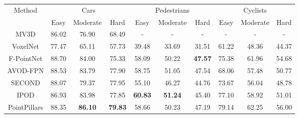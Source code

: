 \documentclass[letterpaper, 10 pt, conference]{ieeeconf}
\begin{document}
\begin{table*}[h]
	\begin{center}
		\begin{tabular}{c|ccc|ccc|ccc}
			\hline
			\multirow{2}{*}{Method}         & \multicolumn{3}{c|}{Cars} & \multicolumn{3}{c|}{Pedestrians} & \multicolumn{3}{c}{Cyclists}                                                                                                       \\ \cline{2-10}
			                                & Easy                      & Moderate                         & Hard                         & Easy           & Moderate       & Hard           & Easy           & Moderate       & Hard           \\ \hline
			MV3D\cite{chen2017multi}        & 86.02                     & 76.90                            & 68.49                        & -              & -              & -              & -              & -              & -              \\
			VoxelNet\cite{zhou2018voxelnet} & 77.47                     & 65.11                            & 57.73                        & 39.48          & 33.69          & 31.51          & 61.22          & 48.36          & 44.37          \\
			F-PointNet\cite{qi2018frustum}  & 88.70                     & 84.00                            & 75.33                        & 58.09          & 50.22          & \textbf{47.57} & 75.38          & 61.96          & 54.68          \\
			AVOD-FPN\cite{ku2018joint}      & 88.53                     & 83.79                            & 77.90                        & 58.75          & 51.05          & 47.54          & 68.06          & 57.48          & 50.77          \\
			SECOND\cite{yan2018second}      & 88.07                     & 79.37                            & 77.95                        & 55.10          & 46.27          & 44.76          & 73.67          & 56.04          & 48.78          \\
			IPOD\cite{yang2018ipod}         & 86.93                     & 83.98                            & 77.85                        & \textbf{60.83} & \textbf{51.24} & 45.40          & 77.10          & 58.92          & 51.01          \\
			PointPillars\cite{lang2018pointpillars}
			                                & 88.35                     & \textbf{86.10}                   & \textbf{79.83}               & 58.66          & 50.23          & 47.19          & 79.14          & 62.25          & 56.00          \\

\end{tabular}
\end{center}
\end{table*}
\end{document}

